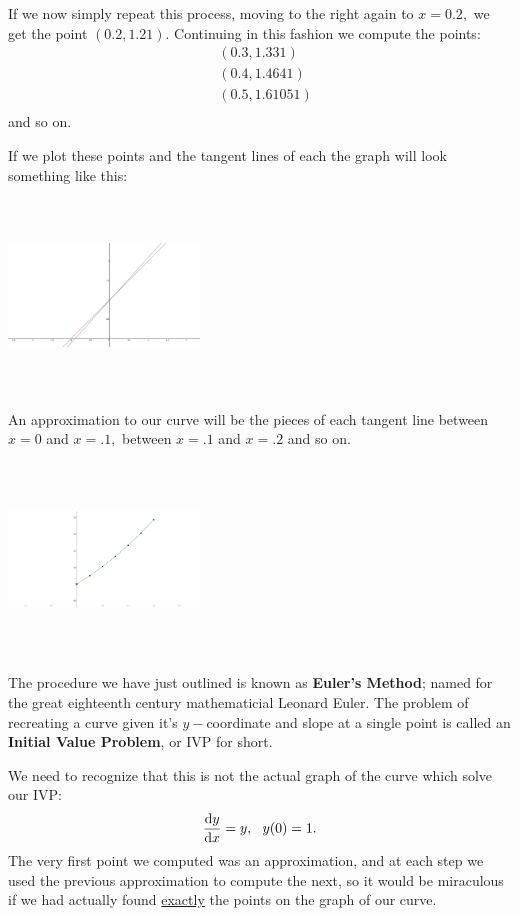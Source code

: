 If we now simply repeat this process, moving to the right again to
$x=0.2,$ we get the point $(0.2, 1.21).$ Continuing in this fashion
we compute the points:
\begin{align*}
  &(0.3,1.331)\\
  &(0.4,1.4641)\\
  &(0.5,1.61051)\\
\end{align*}
and so on.

If we plot these points and the tangent lines of each the graph
will look something like this:\\
\centerline{\includegraphics*[height=2in,width=2in]{Figures/exp-envelope3}}
An approximation to our curve will be the pieces of each tangent line
between $x=0$ and $x=.1,$ between $x=.1$ and $x=.2$ and so on.\\
\centerline{\includegraphics*[height=2in,width=2in]{Figures/exp-piecewise-linear}}


The procedure we have just outlined is known as {\bf Euler's Method};
named for the great eighteenth century mathematicial Leonard
Euler. The problem of recreating a curve given it's $y-$coordinate and
slope at a single point is called an {\bf Initial Value Problem}, or
IVP for short.

We need to recognize that this is not the actual graph of the curve
which solve our IVP:
$$
\dfdx{y}{x} =y, \ \ y(0)=1.
$$ 
The very first point we computed
was an approximation, and at each step we used the previous
approximation to compute the next, so it would be  miraculous if
we had actually found \underline{exactly} the points on the graph of
our curve.

